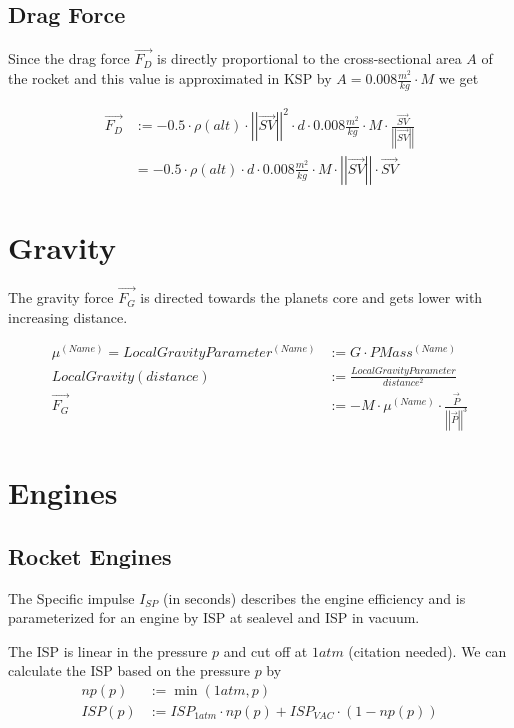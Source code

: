 \documentclass[11pt]{report}
\newcommand{\oa}[1]{\overrightarrow{#1}}
\newcommand{\F}[1]{\oa{F_{#1}}}
\newcommand{\Pos}{\oa{P}}
\newcommand{\absvec}[1]{\left|\left|{#1}\right|\right|}
\begin{document}
\subsection{Drag Force}

Since the drag force $\F{D}$ is directly proportional to the
cross-sectional area $A$ of the rocket and this value is approximated
in KSP by $A = 0.008 \frac{m^2}{kg} \cdot M$ we get

\begin{align}
  \F{D} &:= - 0.5 \cdot \rho(alt)\cdot \absvec{\oa{SV}}^2\cdot d \cdot 0.008\frac{m^2}{kg} \cdot M \cdot \frac{\oa{SV}}{\absvec{\oa{SV}}} \nonumber\\
  &= - 0.5 \cdot \rho(alt)\cdot d \cdot 0.008\frac{m^2}{kg} \cdot M \cdot \absvec{\oa{SV}} \cdot \oa{SV}
\end{align}

\section{Gravity}

The  gravity force $\F{G}$ is directed towards the
planets core and gets lower with increasing distance.

\begin{align}
  \mu^{(Name)} = LocalGravityParameter^{(Name)} &:= G \cdot PMass^{(Name)} \nonumber\\
  LocalGravity(distance) &:= \frac{LocalGravityParameter}{distance^2}\nonumber\\
  \F{G} &:= - M \cdot \mu^{(Name)}\cdot\frac{\Pos}{\absvec{\Pos}^3}
\end{align}

\section{Engines}

\subsection{Rocket Engines}

The  Specific impulse $I_{SP}$ (in seconds) describes the
engine efficiency and is parameterized for an engine by ISP at
sealevel and ISP in vacuum.

The ISP is linear in the pressure $p$ and cut off at $1atm$
(citation needed).  We can calculate the ISP based on the pressure
$p$ by
\begin{align}
  np(p) &:= \min(1 atm, p)\\
  ISP(p) &:= ISP_{1atm} \cdot np(p) + ISP_{VAC} \cdot (1-np(p))
\end{align}
\end{document}
